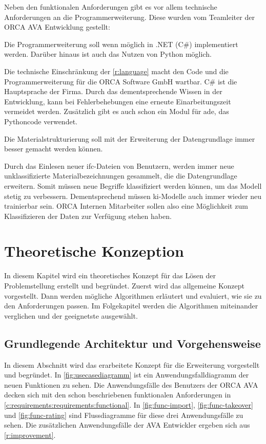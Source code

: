 Neben den funktionalen Anforderungen gibt es vor allem technische Anforderungen an die Programmerweiterung. Diese wurden vom Teamleiter der ORCA AVA Entwicklung gestellt:

\begin{requirement}
	\label{r:language}
	Die Programmerweiterung soll wenn möglich in .NET (C\#) implementiert werden. Darüber hinaus ist auch das Nutzen von Python möglich.
\end{requirement}

Die technische Einschränkung der \autoref{r:language} macht den Code und die Programmerweiterung für die ORCA Software GmbH wartbar. C\# ist die Hauptsprache der Firma. Durch das dementsprechende Wissen in der Entwicklung, kann bei Fehlerbehebungen eine erneute Einarbeitungszeit vermeidet werden. Zusätzlich gibt es auch schon ein Modul für \acf{ade}, das Pythoncode verwendet.

\begin{requirement}
	\label{r:improvement}
	Die Materialstrukturierung soll mit der Erweiterung der Datengrundlage immer besser gemacht werden können.
\end{requirement}

Durch das Einlesen neuer \ac{ifc}-Dateien von Benutzern, werden immer neue unklassifizierte Materialbezeichnungen gesammelt, die die Datengrundlage erweitern. Somit müssen neue Begriffe klassifiziert werden können, um das Modell stetig zu verbessern. Dementsprechend müssen \ac{ki}-Modelle auch immer wieder neu trainierbar sein. ORCA Internen Mitarbeiter sollen also eine Möglichkeit zum Klassifizieren der Daten zur Verfügung stehen haben.

\chapter{Theoretische Konzeption}
\label{c:conception}
In diesem Kapitel wird ein theoretisches Konzept für das Lösen der Problemstellung erstellt und begründet. Zuerst wird das allgemeine Konzept vorgestellt. Dann werden mögliche Algorithmen erläutert und evaluiert, wie sie zu den Anforderungen passen. Im Folgekapitel werden die Algorithmen miteinander verglichen und der geeignetste ausgewählt.

\section{Grundlegende Architektur und Vorgehensweise}
\label{c:conception:architecture}
In diesem Abschnitt wird das erarbeitete Konzept für die Erweiterung vorgestellt und begründet. In \autoref{fig:usecasediagramm} ist ein Anwendungsfalldiagramm der neuen Funktionen zu sehen. Die Anwendungsfälle des Benutzers der ORCA AVA decken sich mit den schon beschriebenen funktionalen Anforderungen in \autoref{c:requirements:requirements:functional}. In \autoref{fig:func-import}, \ref{fig:func-takeover} und \ref{fig:func-rating} sind Flussdiagramme für diese drei Anwendungsfälle zu sehen. Die zusätzlichen Anwendungsfälle der AVA Entwickler ergeben sich aus \autoref{r:improvement}.

